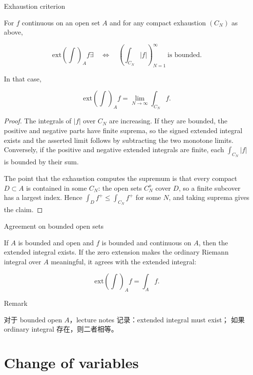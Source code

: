 \begin{theorem}{Exhaustion criterion}

For \(f\) continuous on an open set \(A\) and for any compact exhaustion \(\left( C_{N} \right)\) as above,

\[\text{ext}(\int)_{A}f\exists\quad\Leftrightarrow\quad\left( {\int_{C_{N}}|f|} \right)_{N = 1}^{\infty}\ \text{is bounded}.\]

In that case,

\[\text{ext}(\int)_{A}f = \lim\limits_{N\rightarrow\infty}\int_{C_{N}}f.\]

\end{theorem}

\begin{proof}

The integrals of \(|f|\) over \(C_{N}\) are increasing. If they are bounded, the positive and negative parts have finite suprema, so the signed extended integral exists and the asserted limit follows by subtracting the two monotone limits. Conversely, if the positive and negative extended integrals are finite, each \(\int_{C_{N}}|f|\) is bounded by their sum.

The point that the exhaustion computes the supremum is that every compact \(D \subset A\) is contained in some \(C_{N}\): the open sets \(C_{N}^{o}\) cover \(D\), so a finite subcover has a largest index. Hence \(\int_{D}f^{+} \leq \int_{C_{N}}f^{+}\) for some \(N\), and taking suprema gives the claim.

\end{proof}

\begin{theorem}{Agreement on bounded open sets}

If \(A\) is bounded and open and \(f\) is bounded and continuous on \(A\), then the extended integral exists. If the zero extension makes the ordinary Riemann integral over \(A\) meaningful, it agrees with the extended integral:

\[\text{ext}(\int)_{A}f = \int_{A}f.\]

\end{theorem}

\begin{qlremark}{Remark}

对于 bounded open \(A\)，lecture notes 记录：extended integral must exist； 如果 ordinary integral 存在，则二者相等。

\end{qlremark}

\section{Change of variables}

